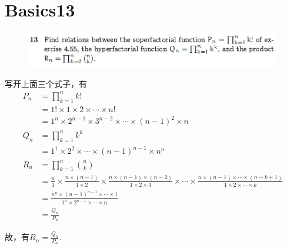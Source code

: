 \documentclass[]{article}
\begin{document}
\section*{Basics13}
\begin{figure}[H]
    
    \includegraphics[scale = 0.6]{2023-03-27-17-12-20.png}
\end{figure}

写开上面三个式子，有
\begin{align}
    P_n &= \prod_{k=1}^{n}k! \\
    &=1! \times  1 \times 2 \times \cdots \times n!\\
    &= 1^{n} \times 2^{n-1} \times 3^{n-2} \times \cdots \times (n-1)^2 \times n\\
    Q_n &= \prod_{k=1}^{n}k^k\\
    &= 1^1 \times 2^2 \times \cdots \times (n-1)^{n-1} \times n^n\\
    R_n &= \prod_{k=1}^{n}\binom{n}{k}\\
    &=\frac{n}{1} \times \frac{n \times (n-1)}{1 \times 2} \times \frac{n \times (n-1) \times (n-2)}{1 \times 2 \times 3} \times \cdots \times \frac{n \times (n-1) \times \cdots \times (n-k+1)}{1 \times 2\times \cdots \times k}\\
    &=\frac{n^n \times (n-1)^{n-1} \times \cdots \times 1}{1^{n} \times 2^{n-1} \times \cdots \times n}\\
    &=\frac{Q_n}{P_n}
\end{align}

故，有$R_n = \frac{Q_n}{P_n}$.
\end{document}
